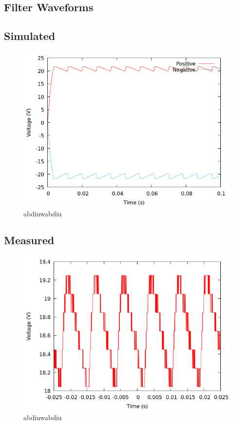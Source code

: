 \documentclass[12pt]{article}
\newcommand{\graphwidth}{0.5\linewidth}
\begin{document}
\begin{appendix}
\section{Filter Waveforms}

\subsection{Simulated}

\begin{figure}[H]
    \centering
    \includegraphics[width=\graphwidth]{./res/image/sim-filtered.png}
    \caption{abdiuwabdiu}
    \label{sim:filtered}
\end{figure}

\subsection{Measured}

\begin{figure}[H]
    \centering
    \includegraphics[width=\graphwidth]{./res/image/rectifier-withload.png}
    \caption{abdiuwabdiu}
    \label{fig:filtered}
\end{figure}


\end{appendix}
\end{document}

